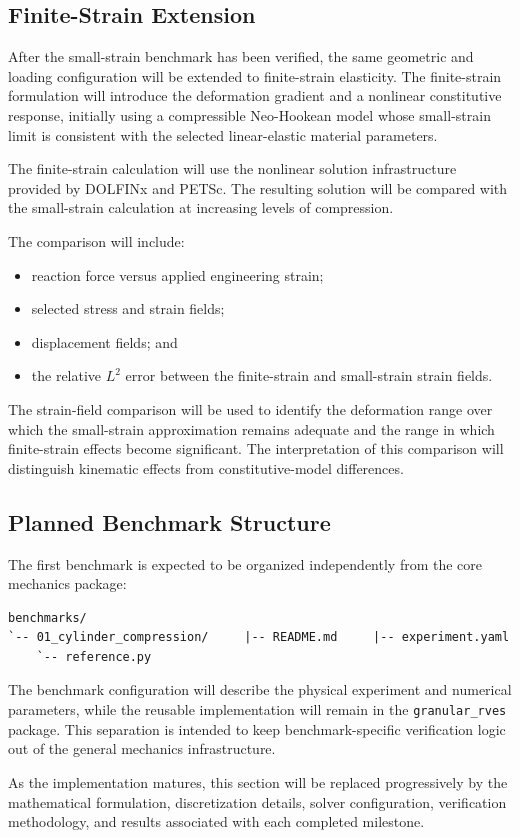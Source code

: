 \subsection{Finite-Strain Extension}

After the small-strain benchmark has been verified, the same geometric and loading configuration will be extended to finite-strain elasticity. The finite-strain formulation will introduce the deformation gradient and a nonlinear constitutive response, initially using a compressible Neo-Hookean model whose small-strain limit is consistent with the selected linear-elastic material parameters.

The finite-strain calculation will use the nonlinear solution infrastructure provided by DOLFINx and PETSc. The resulting solution will be compared with the small-strain calculation at increasing levels of compression.

The comparison will include:

\begin{itemize}
\item reaction force versus applied engineering strain;
\item selected stress and strain fields;
\item displacement fields; and
\item the relative $L^2$ error between the finite-strain and small-strain strain fields.
\end{itemize}

The strain-field comparison will be used to identify the deformation range over which the small-strain approximation remains adequate and the range in which finite-strain effects become significant. The interpretation of this comparison will distinguish kinematic effects from constitutive-model differences.

\subsection{Planned Benchmark Structure}

The first benchmark is expected to be organized independently from the core mechanics package:

\begin{verbatim}
benchmarks/
`-- 01_cylinder_compression/     |-- README.md     |-- experiment.yaml
    `-- reference.py
\end{verbatim}

The benchmark configuration will describe the physical experiment and numerical parameters, while the reusable implementation will remain in the \texttt{granular\_rves} package. This separation is intended to keep benchmark-specific verification logic out of the general mechanics infrastructure.

As the implementation matures, this section will be replaced progressively by the mathematical formulation, discretization details, solver configuration, verification methodology, and results associated with each completed milestone.

